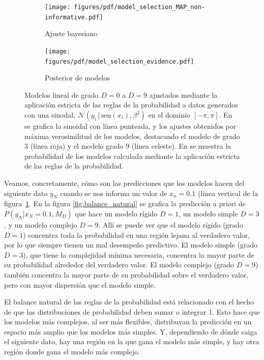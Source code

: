 \documentclass[a4paper,11pt]{book}
\newcommand{\N}{\mathcal{N}}
\theoremstyle{definition}
\begin{document}

\begin{figure}[ht!] \centering
  \begin{subfigure}[t]{0.32\textwidth}
  \centering
  \texttt{[image: figures/pdf/model\_selection\_MAP\_non-informative.pdf]}
  \caption{Ajuste bayesiano}
  \label{fig:model_selection_MAP_non-informative}
  \end{subfigure}
  \begin{subfigure}[t]{0.32\textwidth}
  \centering
  \texttt{[image: figures/pdf/model\_selection\_evidence.pdf]}
  \caption{Posterior de modelos}
  \label{fig:model_selection_evidence}
  \end{subfigure}
  \caption{Modelos lineal de grado $D=0$ a $D=9$ ajustados mediante la aplicaci\'on estricta de las reglas de la probabilidad a datos generados con una sinodal, $\N(y_i \,| \, \text{sen}(x_i), \beta^2)$ en el dominio $[-\pi,\pi]$.
  En  se grafica la sinoidal con l\'inea punteada, y los ajustes obtenidos por m\'axima verosimilitud de los modelos, destacando el modelo de grado 3 (l\'inea roja) y el modelo grado 9 (l\'inea celeste).
  En  se muestra la probabilidad de los modelos calculada mediante la aplicaci\'on estricta de las reglas de la probabilidad.}
  \label{fig:evaluacion_de_modelo}
\end{figure}


Veamos, concretamente, c\'omo son las predicciones que los modelos hacen del siguiente dato $y_N$ cuando se nos informa un valor de $x_n=0.1$ (l\'inea vertical de la figura~\ref{fig:model_selection_MAP_non-informative}.
%
En la figura \ref{fig:balance_natural} se grafica la predicci\'on a priori de $P(y_N|x_N=0.1, M_D)$ que hace un modelo r\'igido $D=1$, un modelo simple $D=3$, y un modelo complejo $D=9$.
%
All\'i se puede ver que el modelo r\'igido (grado $D=1$) concentra toda la probabilidad en una regi\'on lejana al verdadero valor, por lo que siempre tienen un mal desempe\~no predictivo.
%
El modelo simple (grado $D=3$), que tiene la complejidad m\'inima necesaria, concentra la mayor parte de su probabilidad alrededor del verdadero valor.
%
El modelo complejo (grado $D=9$) tambi\'en concentra la mayor parte de su probabilidad sobre el verdadero valor, pero con mayor dispersi\'on que el modelo simple.


El balance natural de las reglas de la probabilidad est\'a relacionado con el hecho de que las distribuciones de probabilidad deben sumar o integrar 1.
%
Esto hace que los modelos m\'as complejos, al ser m\'as flexibles, distribuyan la predicci\'on en un espacio m\'as amplio que los modelos m\'as simples.
%
Y, dependiendo de d\'onde caiga el siguiente dato, hay una regi\'on en la que gana el modelo m\'as simple, y hay otra regi\'on donde gana el modelo m\'as complejo.
\end{document}
